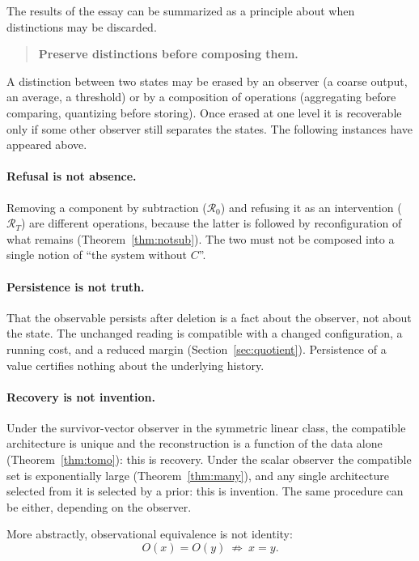 \documentclass[11pt]{article}
\theoremstyle{definition}
\theoremstyle{remark}
\newcommand{\Rop}{\mathcal{R}}
\begin{document}
The results of the essay can be summarized as a principle about when distinctions may be discarded.

\begin{quote}
\textbf{Preserve distinctions before composing them.}
\end{quote}

A distinction between two states may be erased by an observer (a coarse output, an average, a threshold) or by a composition of operations (aggregating before comparing, quantizing before storing). Once erased at one level it is recoverable only if some other observer still separates the states. The following instances have appeared above.

\paragraph{Refusal is not absence.}
Removing a component by subtraction ($\Rop_0$) and refusing it as an intervention ($\Rop_T$) are different operations, because the latter is followed by reconfiguration of what remains (Theorem~\ref{thm:notsub}). The two must not be composed into a single notion of ``the system without $C$''.

\paragraph{Persistence is not truth.}
That the observable persists after deletion is a fact about the observer, not about the state. The unchanged reading is compatible with a changed configuration, a running cost, and a reduced margin (Section~\ref{sec:quotient}). Persistence of a value certifies nothing about the underlying history.

\paragraph{Recovery is not invention.}
Under the survivor-vector observer in the symmetric linear class, the compatible architecture is unique and the reconstruction is a function of the data alone (Theorem~\ref{thm:tomo}): this is recovery. Under the scalar observer the compatible set is exponentially large (Theorem~\ref{thm:many}), and any single architecture selected from it is selected by a prior: this is invention. The same procedure can be either, depending on the observer.

More abstractly, observational equivalence is not identity:
\[
O(x)=O(y)\ \not\Longrightarrow\ x=y .
\]
\end{document}
